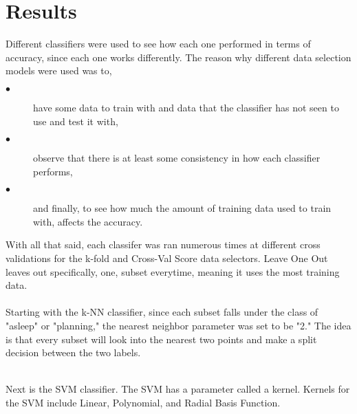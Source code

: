 \documentclass{report}
\begin{document}
\section{Results}
Different classifiers were used to see how each one performed in terms of accuracy, since each one works differently. The reason why different data selection models 
were used was to,
\begin{description}
	\item[$\bullet$] have some data to train with and data that the classifier has not seen to use and test it with,
	\item[$\bullet$] observe that there is at least some consistency in how each classifier performs,
	\item[$\bullet$] and finally, to see how much the amount of training data used to train with, affects the accuracy.
\end{description}
\noindent With all that said, each classifer was ran numerous times at different cross validations for the k-fold and Cross-Val Score data selectors. Leave One Out leaves out 
specifically, one, subset everytime, meaning it uses the most training data.
\\ \\Starting with the k-NN classifier, since each subset falls under the class of "asleep" or "planning," the nearest neighbor parameter 
was set to be "2." The idea is that every subset will look into the nearest two points and make a split decision between the two labels.
\begin{table}[h]
	\noindent{}
	\caption{Accuracies for k-NN Classifier}
	\label{table1}
\end{table}
\\ \noindent Next is the SVM classifier. The SVM has a parameter called a kernel. Kernels for the SVM include Linear, Polynomial, and Radial Basis Function. 
\end{document}
